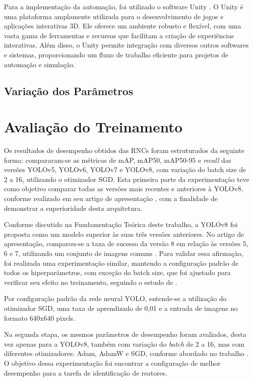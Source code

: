 Para a implementação da automação, foi utilizado o software Unity \cite{unity}. O Unity é uma plataforma amplamente utilizada para o desenvolvimento de jogos e aplicações interativas 3D. Ele oferece um ambiente robusto e flexível, com uma vasta gama de ferramentas e recursos que facilitam a criação de experiências interativas. Além disso, o Unity permite integração com diversos outros softwares e sistemas, proporcionando um fluxo de trabalho eficiente para projetos de automação e simulação.

\subsection{Variação dos Parâmetros}

\section{Avaliação do Treinamento} 

Os resultados de desempenho obtidos das RNCs foram estruturados da seguinte forma: compararam-se as métricas de mAP, mAP50, mAP50-95 e \textit{recall} das versões YOLOv5, YOLOv6, YOLOv7 e YOLOv8, com variação do batch size de 2 a 16, utilizando o otimizador SGD. Esta primeira parte da experimentação teve como objetivo comparar todas as versões mais recentes e anteriores à YOLOv8, conforme realizado em seu artigo de apresentação \cite{ultralytics2023yolo}, com a finalidade de demonstrar a superioridade desta arquitetura.

Conforme discutido na Fundamentação Teórica deste trabalho, a YOLOv8 foi proposta como um modelo superior às suas três versões anteriores. No artigo de apresentação, comparou-se a taxa de sucesso da versão 8 em relação às versões 5, 6 e 7, utilizando um conjunto de imagens comuns \cite{ultralytics2023yolo}. Para validar essa afirmação, foi realizada uma experimentação similar, mantendo a configuração padrão de todos os hiperparâmetros, com exceção do batch size, que foi ajustado para verificar seu efeito no treinamento, seguindo o estudo de \cite{gonzaga2023identificaccao}.

Por configuração padrão da rede neural YOLO, entende-se a utilização do otimizador SGD, uma taxa de aprendizado de 0,01 e a entrada de imagens no formato 640x640 pixels.

Na segunda etapa, os mesmos parâmetros de desempenho foram avaliados, desta vez apenas para a YOLOv8, também com variação do \textit{batch} de 2 a 16, mas com diferentes otimizadores: Adam, AdamW e SGD, conforme abordado no trabalho \cite{gonzaga2023identificaccao}. O objetivo dessa experimentação foi encontrar a configuração de melhor desempenho para a tarefa de identificação de reatores.

